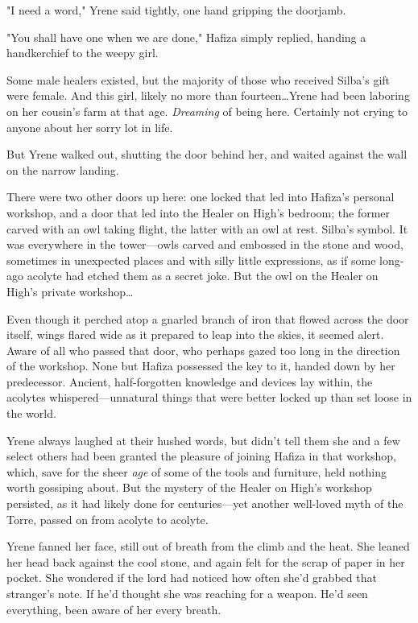 "I need a word," Yrene said tightly, one hand gripping the doorjamb.

"You shall have one when we are done," Hafiza simply replied, handing a handkerchief to the weepy girl.

Some male healers existed, but the majority of those who received Silba's gift were female. And this girl, likely no more than fourteen\ldots Yrene had been laboring on her cousin's farm at that age. \emph{Dreaming} of being here. Certainly not crying to anyone about her sorry lot in life.

But Yrene walked out, shutting the door behind her, and waited against the wall on the narrow landing.

There were two other doors up here: one locked that led into Hafiza's personal workshop, and a door that led into the Healer on High's bedroom; the former carved with an owl taking flight, the latter with an owl at rest. Silba's symbol. It was everywhere in the tower---owls carved and embossed in the stone and wood, sometimes in unexpected places and with silly little expressions, as if some long-ago acolyte had etched them as a secret joke. But the owl on the Healer on High's private workshop\ldots

Even though it perched atop a gnarled branch of iron that flowed across the door itself, wings flared wide as it prepared to leap into the skies, it seemed  alert. Aware of all who passed that door, who perhaps gazed too long in the direction of the workshop. None but Hafiza possessed the key to it, handed down by her predecessor. Ancient, half-forgotten knowledge and devices lay within, the acolytes whispered---unnatural things that were better locked up than set loose in the world.

Yrene always laughed at their hushed words, but didn't tell them she and a few select others had been granted the pleasure of joining Hafiza in that workshop, which, save for the sheer \emph{age} of some of the tools and furniture, held nothing worth gossiping about. But the mystery of the Healer on High's workshop persisted, as it had likely done for centuries---yet another well-loved myth of the Torre, passed on from acolyte to acolyte.

Yrene fanned her face, still out of breath from the climb and the heat. She leaned her head back against the cool stone, and again felt for the scrap of paper in her pocket. She wondered if the lord had noticed how often she'd grabbed that stranger's note. If he'd thought she was reaching for a weapon. He'd seen everything, been aware of her every breath.

